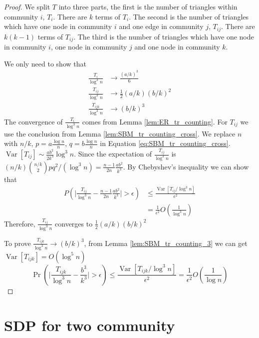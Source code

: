 \documentclass{article}
\DeclareMathOperator{\Var}{Var}
\begin{document}
\begin{proof}
	We split $T$ into three parts, the first is the number of triangles within community $i$, $T_i$. There are $k$ terms of $T_i$.
	The second is the number of triangles which have one node in community $i$ and one edge in community $j$, $T_{ij}$. There are $k(k-1)$ terms of $T_{ij}$. The third is the number of triangles which have one node in community $i$, one node in community $j$ and one node in community $k$.
	
	We only need to show that
	\begin{align}
	\frac{T_i}{\log ^3 n} &\to \frac{(a/k)^3}{6} \\
	\frac{T_{ij}}{\log^3 n}& \to \frac{1}{2}(a/k)(b/k)^2\\
	\frac{T_{ijk}}{\log^3 n} & \to (b/k)^3
	\end{align}
	The convergence of $\frac{T_i}{\log ^3 n}$ comes from Lemma \ref{lem:ER_tr_counting}.
	For $T_{ij}$ we use the conclusion from Lemma \ref{lem:SBM_tr_counting_cross}.
	We replace $n$ with $n/k$, $p=a\frac{\log n}{n}$, $q=b\frac{\log n}{n}$ in Equation \eqref{eq:SBM_tr_counting_cross}.
$\Var[T_{ij}] \sim \frac{ab^2}{2k^3} \log^3 n$. Since the expectation of $\frac{T_{ij}}{\log^3 n}$ is $(n/k)\binom{n/k}{2}pq^2/(\log^3 n)
=\frac{n-1}{2n}\frac{ab^2}{k^3}$. By Chebyshev's inequality we can show that 
\begin{align*}
P( \Big|\frac{T_{ij}}{\log^3 n} - \frac{n-1}{2n}\frac{ab^2}{k^3} \Big| > \epsilon) &\leq \frac{\Var[T_{ij} / \log^3 n]}{\epsilon^2} \\
& = \frac{1}{\epsilon^2}
O(\frac{1}{\log^3 n})
\end{align*}
	Therefore, $\frac{T_{ij}}{\log^3 n} $ converges to $\frac{1}{2}(a/k)(b/k)^2$
	
	To prove $\frac{T_{ijk}}{\log^3 n}\to (b/k)^3$, from Lemma \ref{lem:SBM_tr_counting_3} we can get $\Var[T_{ijk}] = O(\log^5 n)$
$$
\Pr( \Big|\frac{T_{ijk}}{\log^3 n} -\frac{b^3}{k^3} \Big| > \epsilon) \leq \frac{\Var[T_{ijk} / \log^3 n]}{\epsilon^2} = \frac{1}{\epsilon^2}
O(\frac{1}{\log n})
$$
\end{proof}
\section{SDP for two community}
\end{document}
